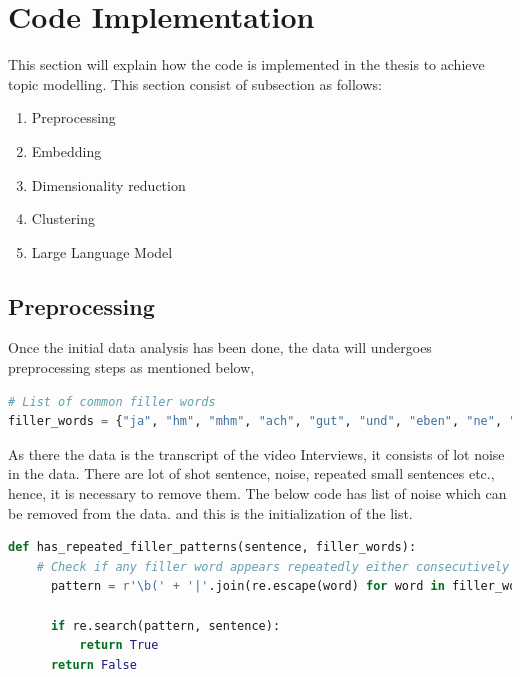 
\section{Code Implementation}

This section will explain how the code is implemented in the thesis to achieve topic modelling. 
This section consist of subsection as follows:
\begin{enumerate}
  \item Preprocessing
  \item Embedding
  \item Dimensionality reduction
  \item Clustering
  \item Large Language Model
\end{enumerate}


\subsection{Preprocessing}

Once the initial data analysis has been done, the data will undergoes preprocessing steps as mentioned below,
\begin{lstlisting}[language=Python , caption={Initialization of the list of noise}]
# List of common filler words
filler_words = {"ja", "hm", "mhm", "ach", "gut", "und", "eben", "ne", "ok", "aha", "ach so", "nicht", "ja", "nein", "wieder", "schon", "naja", "wieso", "wieso nicht", "wieso nicht"}

\end{lstlisting}

As there the data is the transcript of the video Interviews, it consists of lot noise in the data. There are lot of shot sentence, noise, repeated small sentences etc., hence, it is necessary to remove them.
The below code has list of noise which can be removed from the data. and this is the initialization of the list.

\begin{lstlisting}[language=Python, caption={Filtering of noise from the data}]
  def has_repeated_filler_patterns(sentence, filler_words):
    # Check if any filler word appears repeatedly either consecutively or separated by commas or spaces in the sentence.
      pattern = r'\b(' + '|'.join(re.escape(word) for word in filler_words) + r')\b(?:[\s,]+)+\1\b'
      
      if re.search(pattern, sentence):
          return True
      return False
  \end{lstlisting}

